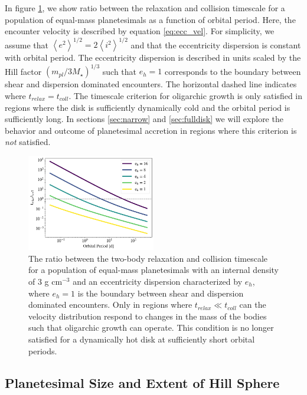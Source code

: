 \documentclass[twocolumn]{aastex63}
\begin{document}
In figure \ref{fig:timescales}, we show ratio between the relaxation
and collision timescale for a population of equal-mass planetesimals
as a function of orbital period. Here, the encounter velocity is
described by equation \ref{eq:ecc_vel}. For
simplicity, we assume that $\left< e^2 \right>^{1/2} = 2\left< i^2
\right>^{1/2}$ \citep{ida93a} and that the eccentricity dispersion is
constant with orbital period. The eccentricity dispersion is described
in units scaled by the Hill factor $\left( m_{pl}/ 3 M_{\star}
\right)^{1/3}$ such that $e_{h} = 1$ corresponds to the boundary
between shear and dispersion dominated encounters. The horizontal
dashed line indicates where $t_{relax} = t_{coll}$. The timescale
criterion for oligarchic growth is only satisfied in regions where the
disk is sufficiently dynamically cold and the orbital period is
sufficiently long. In sections \ref{sec:narrow} and \ref{sec:fulldisk}
we will explore the behavior and outcome of planetesimal accretion in regions where this criterion is \textit{not} satisfied. 

\begin{figure}
\begin{center}
    \includegraphics[width=0.5\textwidth]{figures/timescales.png}
    \caption{The ratio between the two-body relaxation and collision
      timescale for a population of equal-mass planetesimals with an
      internal density of 3 g cm$^{-3}$ and an eccentricity dispersion
      characterized by $e_h$, where $e_h = 1$ is the boundary between
      shear and dispersion dominated encounters. Only in regions where $t_{relax} \ll t_{coll}$ can the velocity distribution respond to changes in the mass of the bodies such that oligarchic growth can operate. This condition is no longer satisfied for a dynamically hot disk at sufficiently short orbital periods.\label{fig:timescales}}
\end{center}
\end{figure}

\subsection{Planetesimal Size and Extent of Hill Sphere}\label{sec:sizeandhill}
\end{document}

